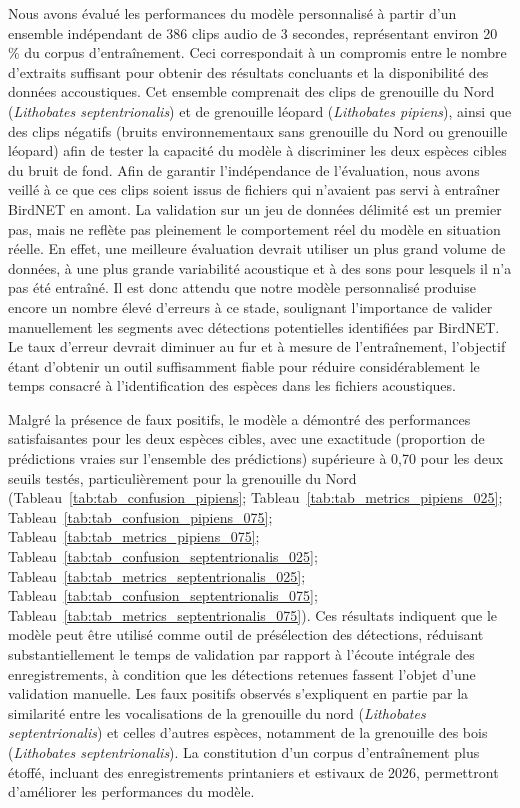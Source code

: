 Nous avons évalué les performances du modèle personnalisé à partir d'un ensemble indépendant de 386 clips audio de 3 secondes, représentant environ 20 \% du corpus d'entraînement. Ceci correspondait à un compromis entre le nombre d'extraits suffisant pour obtenir des résultats concluants et la disponibilité des données accoustiques. Cet ensemble comprenait des clips de grenouille du Nord (\emph{Lithobates septentrionalis}) et de grenouille léopard (\emph{Lithobates pipiens}), ainsi que des clips négatifs (bruits environnementaux sans grenouille du Nord ou grenouille léopard) afin de tester la capacité du modèle à discriminer les deux espèces cibles du bruit de fond. Afin de garantir l’indépendance de l’évaluation, nous avons veillé à ce que ces clips soient issus de fichiers qui n’avaient pas servi à entraîner BirdNET en amont. La validation sur un jeu de données délimité est un premier pas, mais ne reflète pas pleinement le comportement réel du modèle en situation réelle. En effet, une meilleure évaluation devrait utiliser un plus grand volume de données, à une plus grande variabilité acoustique et à des sons pour lesquels il n'a pas été entraîné. Il est donc attendu que notre modèle personnalisé produise encore un nombre élevé d'erreurs à ce stade, soulignant l'importance de valider manuellement les segments avec détections potentielles identifiées par BirdNET. Le taux d'erreur devrait diminuer au fur et à mesure de l'entraînement, l'objectif étant d'obtenir un outil suffisamment fiable pour réduire considérablement le temps consacré à l'identification des espèces dans les fichiers acoustiques.

Malgré la présence de faux positifs, le modèle a démontré des performances satisfaisantes pour les deux espèces cibles, avec une exactitude (proportion de prédictions vraies sur l’ensemble des prédictions) supérieure à 0,70 pour les deux seuils testés, particulièrement pour la grenouille du Nord (Tableau~\ref{tab:tab_confusion_pipiens}; Tableau~\ref{tab:tab_metrics_pipiens_025}; Tableau~\ref{tab:tab_confusion_pipiens_075}; Tableau~\ref{tab:tab_metrics_pipiens_075}; Tableau~\ref{tab:tab_confusion_septentrionalis_025}; Tableau~\ref{tab:tab_metrics_septentrionalis_025}; Tableau~\ref{tab:tab_confusion_septentrionalis_075}; Tableau~\ref{tab:tab_metrics_septentrionalis_075}). Ces résultats indiquent que le modèle peut être utilisé comme outil de présélection des détections, réduisant substantiellement le temps de validation par rapport à l'écoute intégrale des enregistrements, à condition que les détections retenues fassent l'objet d'une validation manuelle. Les faux positifs observés s'expliquent en partie par la similarité entre les vocalisations de la grenouille du nord (\emph{Lithobates septentrionalis}) et celles d'autres espèces, notamment de la grenouille des bois (\emph{Lithobates septentrionalis}). La constitution d'un corpus d'entraînement plus étoffé, incluant des enregistrements printaniers et estivaux de 2026, permettront d’améliorer les performances du modèle.

